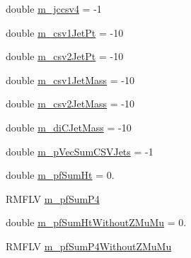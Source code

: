 \begin{DoxyCompactItemize}
\item 
double \hyperlink{classHttProduct_a2063343b5b6864ced890829817b8e98c}{m\_\-jccsv4} = -\/1
\item 
double \hyperlink{classHttProduct_a24c512c316b95df8293cc5fb66a146bc}{m\_\-csv1JetPt} = -\/10
\item 
double \hyperlink{classHttProduct_a4cc75b7222fe46c6a57933454a69c859}{m\_\-csv2JetPt} = -\/10
\item 
double \hyperlink{classHttProduct_a58b4fd27f0f6ff1a9abe8ba113e137fb}{m\_\-csv1JetMass} = -\/10
\item 
double \hyperlink{classHttProduct_ac5607acc08338d09bda39eb55684acb9}{m\_\-csv2JetMass} = -\/10
\item 
double \hyperlink{classHttProduct_afd2b667de3da0cab39012456116ff14a}{m\_\-diCJetMass} = -\/10
\item 
double \hyperlink{classHttProduct_a44276b9923909f4eca106fcec1968b30}{m\_\-pVecSumCSVJets} = -\/1
\item 
double \hyperlink{classHttProduct_acc65cd96f1114a8c00337ce3b57ea03b}{m\_\-pfSumHt} = 0.
\item 
RMFLV \hyperlink{classHttProduct_a7ead93647a4958c65f8bb84c689ea0b5}{m\_\-pfSumP4}
\item 
double \hyperlink{classHttProduct_ad0bfad9592c131371736c14e9ed16e71}{m\_\-pfSumHtWithoutZMuMu} = 0.
\item 
RMFLV \hyperlink{classHttProduct_a8304bb2e0d778a235a427993641ed25f}{m\_\-pfSumP4WithoutZMuMu}
\end{DoxyCompactItemize}


